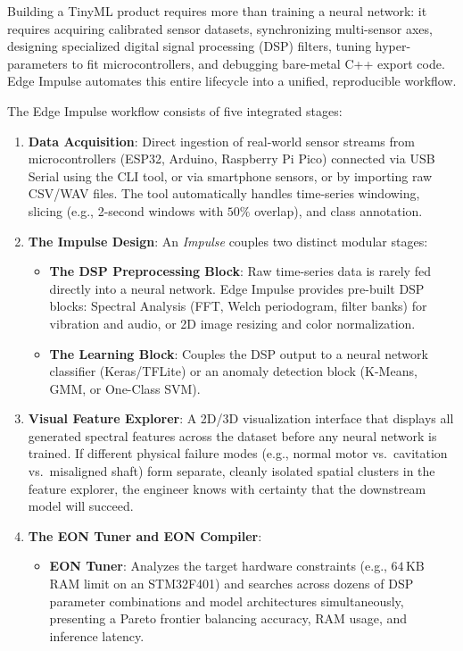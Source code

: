 \begin{keyidea}
Building a TinyML product requires more than training a neural network: it requires acquiring calibrated sensor datasets, synchronizing multi-sensor axes, designing specialized digital signal processing (DSP) filters, tuning hyper-parameters to fit microcontrollers, and debugging bare-metal C++ export code. Edge Impulse automates this entire lifecycle into a unified, reproducible workflow.
\end{keyidea}

The Edge Impulse workflow consists of five integrated stages:
\begin{enumerate}
    \item \textbf{Data Acquisition}: Direct ingestion of real-world sensor streams from microcontrollers (ESP32, Arduino, Raspberry Pi Pico) connected via USB Serial using the  CLI tool, or via smartphone sensors, or by importing raw CSV/WAV files. The tool automatically handles time-series windowing, slicing (e.g., 2-second windows with $50\%$ overlap), and class annotation.
    \item \textbf{The Impulse Design}: An \emph{Impulse} couples two distinct modular stages:
    \begin{itemize}
        \item \textbf{The DSP Preprocessing Block}: Raw time-series data is rarely fed directly into a neural network. Edge Impulse provides pre-built DSP blocks: Spectral Analysis (FFT, Welch periodogram, filter banks) for vibration and audio, or 2D image resizing and color normalization.
        \item \textbf{The Learning Block}: Couples the DSP output to a neural network classifier (Keras/TFLite) or an anomaly detection block (K-Means, GMM, or One-Class SVM).
    \end{itemize}
    \item \textbf{Visual Feature Explorer}: A 2D/3D visualization interface that displays all generated spectral features across the dataset before any neural network is trained. If different physical failure modes (e.g., normal motor vs.\ cavitation vs.\ misaligned shaft) form separate, cleanly isolated spatial clusters in the feature explorer, the engineer knows with certainty that the downstream model will succeed.
    \item \textbf{The EON Tuner and EON Compiler}:
    \begin{itemize}
        \item \textbf{EON Tuner}: Analyzes the target hardware constraints (e.g., $64\,\text{KB}$ RAM limit on an STM32F401) and searches across dozens of DSP parameter combinations and model architectures simultaneously, presenting a Pareto frontier balancing accuracy, RAM usage, and inference latency.

\end{itemize}
\end{enumerate}
